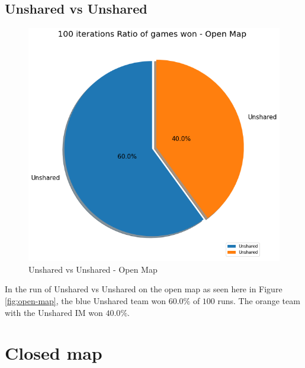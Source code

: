\documentclass[]{report}
\begin{document}
		\subsection{Unshared vs Unshared}
		\begin{figure}[h!]
			\centering
			\includegraphics[width=0.9\linewidth]{"Images/100 Games Unshared vs Unshared Open Map"}
			\caption[Unshared vs Unshared - Open Map]{Unshared vs Unshared - Open Map}
			\label{fig:100-games-unshared-vs-unshared-open-map}
		\end{figure}
	In the run of Unshared vs Unshared on the open map as seen here in Figure \ref{fig:open-map}, the blue Unshared team won $60.0\%$ of $100$ runs. The orange team with the Unshared \ac{IM} won $40.0\%$.
		
		\clearpage
		\section{Closed map}
\end{document}

